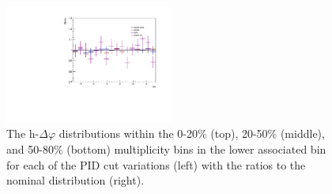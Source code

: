 \begin{figure}[ht]
    \includegraphics[width=0.49\textwidth]{figures/analysis/pid_variations_dphi_50_80_lowpt_ratio.pdf}
    \caption{The h-\lmb $\Delta\varphi$ distributions within the 0-20\% (top), 20-50\% (middle), and 50-80\% (bottom) multiplicity bins in the lower associated \pt bin for each of the PID cut variations (left) with the ratios to the nominal distribution (right).}
    \label{fig:pid_cut_variations_lowpt}
\end{figure}

